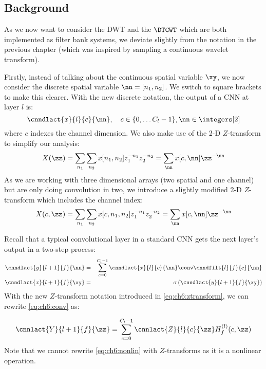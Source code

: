 \subsection{Background}
As we now want to consider the DWT and the $\DTCWT$ which are both implemented
as filter bank systems, we deviate slightly from the notation in the previous
chapter (which was inspired by sampling a continuous wavelet transform). 

Firstly, instead of talking about the continuous spatial variable $\xy$, we now
consider the discrete spatial variable $\nn = [n_1, n_2]$. We switch to square 
brackets to make this clearer. With the new discrete notation, the output of a CNN at layer $l$ is:
%
\begin{equation}
  \cnndlact{x}{l}{c}{\nn}, \quad c\in \{0, \ldots C_l-1\}, \nn \in \integers[2]
\end{equation}
%
where $c$ indexes the channel dimension. 
We also make use of the 2-D $Z$-transform to simplify our analysis:
%
\begin{equation}
  X(\zz) = \sum_{n_1}\sum_{n_2} x[n_1, n_2]z_1^{-n_1}z_2^{-n_2} =
  \sum_{\nn}x[c, \nn]\zz^{-\nn}
\end{equation}
%
As we are working with three dimensional arrays (two spatial and one channel) but are
only doing convolution in two, we introduce a slightly modified 2-D $Z$-transform
which includes the channel index:
%
\begin{equation}
  X(c, \zz) = \sum_{n_1}\sum_{n_2} x[c, n_1, n_2]z_1^{-n_1}z_2^{-n_2} =
  \sum_{\nn}x[c, \nn]\zz^{-\nn} \label{eq:ch6:ztransform}
\end{equation}

Recall that a typical convolutional
layer in a standard CNN gets the next layer's output in a two-step process:
%
\begin{eqnarray} 
  \cnndlact{y}{l+1}{f}{\nn} &=& \sum_{c=0}^{C_l - 1} \cnndlact{x}{l}{c}{\nn} \conv \cnndfilt{l}{f}{c}{\nn}
    \label{eq:ch6:conv}\\
    \cnndlact{x}{l+1}{f}{\xy} & = & \sigma \left( \cnndlact{y}{l+1}{f}{\xy} \right) \label{eq:ch6:nonlin}
\end{eqnarray}
%
With the new $Z$-transform notation introduced in \eqref{eq:ch6:ztransform}, we
can rewrite \eqref{eq:ch6:conv} as:

\begin{equation}
  \cnnlact{Y}{l+1}{f}{\zz} = \sum_{c=0}^{C_l - 1} \cnnlact{Z}{l}{c}{\zz}
  H_f^{(l)}(c, \zz)
\end{equation}
%
Note that we cannot rewrite \eqref{eq:ch6:nonlin} with $Z$-transforms as it is a nonlinear
operation.

